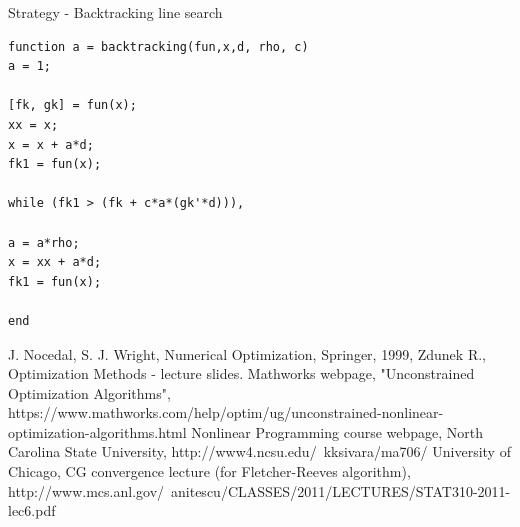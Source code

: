 \documentclass[eng,openany]{mgr}
\begin{document}
\newpage
Strategy - Backtracking line search \cite{uni}\\
\begin{lstlisting}
function a = backtracking(fun,x,d, rho, c)
a = 1;

[fk, gk] = fun(x);
xx = x;
x = x + a*d;
fk1 = fun(x);

while (fk1 > (fk + c*a*(gk'*d))),

a = a*rho;
x = xx + a*d;
fk1 = fun(x);

end
\end{lstlisting}
\begin{thebibliography}{8}
J. Nocedal, S. J. Wright, Numerical Optimization, Springer, 1999,
Zdunek R., Optimization Methods - lecture slides.
Mathworks webpage, "Unconstrained Optimization Algorithms", https://www.mathworks.com/help/optim/ug/unconstrained-nonlinear-optimization-algorithms.html
Nonlinear Programming course webpage, North Carolina State University,
http://www4.ncsu.edu/~kksivara/ma706/
University of Chicago, CG convergence lecture (for Fletcher-Reeves algorithm), 
http://www.mcs.anl.gov/~anitescu/CLASSES/2011/LECTURES/STAT310-2011-lec6.pdf
\end{thebibliography}
\end{document}
